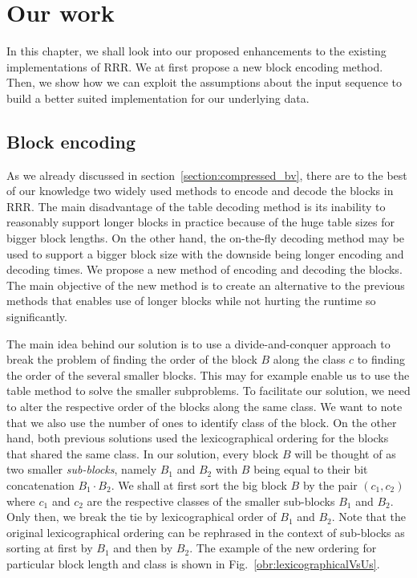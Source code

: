 \chapter{Our work}
\label{kap:kap3}

In this chapter, we shall look into our proposed enhancements to the existing
implementations of RRR. We at first propose a new block encoding method.
Then, we show how we can exploit the assumptions about the input sequence to
build a better suited implementation for our underlying data. 

\section{Block encoding}

As we already discussed in section~\ref{section:compressed_bv}, there are to
the best of our knowledge two widely used methods to encode and decode the
blocks in RRR. The main disadvantage of the table decoding method is its
inability to reasonably support longer blocks in practice because of the
huge table sizes for bigger block lengths. On the other hand, the on-the-fly
decoding method may be used to support a bigger block size with the downside
being longer encoding and decoding times. We propose a new method of encoding
and decoding the blocks. The main objective of the new method is to create an
alternative to the previous methods that enables use of longer blocks while not
hurting the runtime so significantly.

The main idea behind our solution is to use a divide-and-conquer approach to break
the problem of finding the order of the block $B$ along the class $c$ to finding the order
of the several smaller blocks. This may for example enable us to use the table method to solve the
smaller subproblems. To facilitate our solution, we need to alter the respective order of
the blocks along the same class. We want to note that we also use the number of ones to
identify class of the block. On the other hand, both previous solutions used the lexicographical ordering
for the blocks that shared the same class. In our solution, every block $B$ will be thought
of as two smaller \textit{sub-blocks}, namely $B_1$ and $B_2$ with $B$ being equal to their bit
concatenation $B_1\cdot B_2$. We shall at first sort the big block $B$ by the pair $(c_1, c_2)$
where $c_1$ and $c_2$ are the respective classes of the smaller sub-blocks $B_1$ and $B_2$. Only then,
we break the tie by lexicographical order of $B_1$ and $B_2$. Note that the original lexicographical
ordering can be rephrased in the context of sub-blocks as sorting at first by $B_1$ and then by
$B_2$. The example of the new ordering for particular block length and class is shown in
Fig.~\ref{obr:lexicographicalVsUs}.

